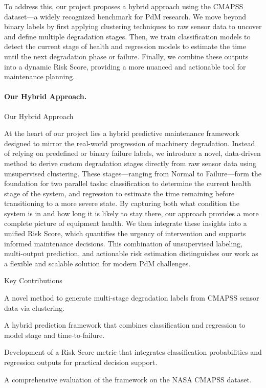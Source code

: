 To address this, our project proposes a hybrid approach using the CMAPSS dataset—a widely recognized benchmark for PdM research. We move beyond binary labels by first applying clustering techniques to raw sensor data to uncover and define multiple degradation stages. Then, we train classification models to detect the current stage of health and regression models to estimate the time until the next degradation phase or failure. Finally, we combine these outputs into a dynamic Risk Score, providing a more nuanced and actionable tool for maintenance planning.

\paragraph{Our Hybrid Approach.}
Our Hybrid Approach

At the heart of our project lies a hybrid predictive maintenance framework designed to mirror the real-world progression of machinery degradation. Instead of relying on predefined or binary failure labels, we introduce a novel, data-driven method to derive custom degradation stages directly from raw sensor data using unsupervised clustering. These stages—ranging from Normal to Failure—form the foundation for two parallel tasks: classification to determine the current health stage of the system, and regression to estimate the time remaining before transitioning to a more severe state. By capturing both what condition the system is in and how long it is likely to stay there, our approach provides a more complete picture of equipment health. We then integrate these insights into a unified Risk Score, which quantifies the urgency of intervention and supports informed maintenance decisions. This combination of unsupervised labeling, multi-output prediction, and actionable risk estimation distinguishes our work as a flexible and scalable solution for modern PdM challenges.

Key Contributions

A novel method to generate multi-stage degradation labels from CMAPSS sensor data via clustering.

A hybrid prediction framework that combines classification and regression to model stage and time-to-failure.

Development of a Risk Score metric that integrates classification probabilities and regression outputs for practical decision support.

A comprehensive evaluation of the framework on the NASA CMAPSS dataset.
